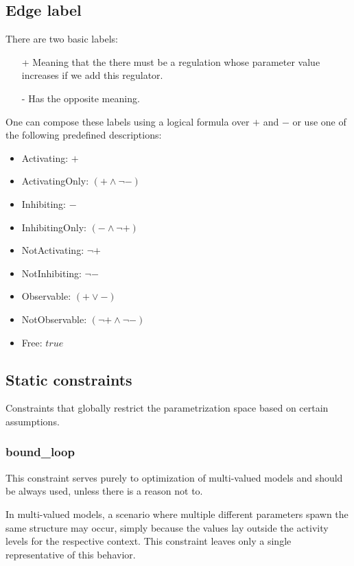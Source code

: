 \documentclass[12pt]{article}
\begin{document}
\subsection{Edge label}
\label{EdgeLabel}
There are two basic labels:
\begin{itemize}
\item [+]	Meaning that the there must be a regulation whose parameter value increases if we add this regulator.
\item [-]	Has the opposite meaning.
\end{itemize}
One can compose these labels using a logical formula over $+$ and $-$ or use one of the following predefined descriptions:
\begin{itemize}
\item Activating: $+$
\item ActivatingOnly: $(+ \wedge \neg -)$
\item Inhibiting: $-$
\item InhibitingOnly: $(- \wedge \neg +)$
\item NotActivating: $\neg +$
\item NotInhibiting: $\neg -$
\item Observable: $(+ \vee -)$
\item NotObservable: $(\neg + \wedge \neg -)$
\item Free: $true$

\end{itemize}

\subsection{Static constraints}
\label{StaticConstraints}
Constraints that globally restrict the parametrization space based on certain assumptions.
\subsubsection{bound\_loop}
This constraint serves purely to optimization of multi-valued models and should be always used, unless there is a reason not to.

In multi-valued models, a scenario where multiple different parameters spawn the same structure may occur, simply because the values lay outside the activity levels for the respective context. This constraint leaves only a single representative of this behavior.
\end{document}
